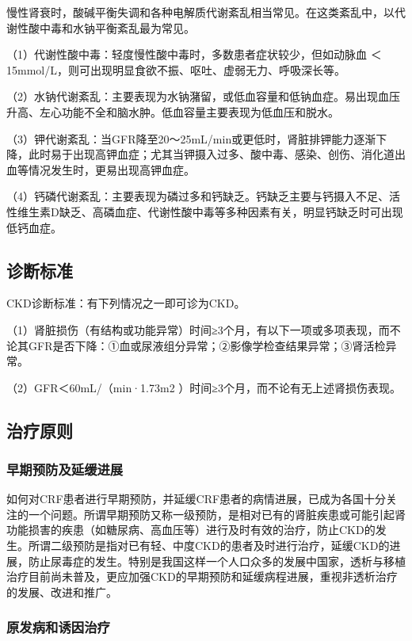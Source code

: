 慢性肾衰时，酸碱平衡失调和各种电解质代谢紊乱相当常见。在这类紊乱中，以代谢性酸中毒和水钠平衡紊乱最为常见。

（1）代谢性酸中毒：轻度慢性酸中毒时，多数患者症状较少，但如动脉血
＜15mmol/L，则可出现明显食欲不振、呕吐、虚弱无力、呼吸深长等。

（2）水钠代谢紊乱：主要表现为水钠潴留，或低血容量和低钠血症。易出现血压升高、左心功能不全和脑水肿。低血容量主要表现为低血压和脱水。

（3）钾代谢紊乱：当GFR降至20～25mL/min或更低时，肾脏排钾能力逐渐下降，此时易于出现高钾血症；尤其当钾摄入过多、酸中毒、感染、创伤、消化道出血等情况发生时，更易出现高钾血症。

（4）钙磷代谢紊乱：主要表现为磷过多和钙缺乏。钙缺乏主要与钙摄入不足、活性维生素D缺乏、高磷血症、代谢性酸中毒等多种因素有关，明显钙缺乏时可出现低钙血症。

\subsection{诊断标准}

CKD诊断标准：有下列情况之一即可诊为CKD。

（1）肾脏损伤（有结构或功能异常）时间≥3个月，有以下一项或多项表现，而不论其GFR是否下降：①血或尿液组分异常；②影像学检查结果异常；③肾活检异常。

（2）GFR＜60mL/（min·1.73m{2} ）时间≥3个月，而不论有无上述肾损伤表现。

\subsection{治疗原则}

\subsubsection{早期预防及延缓进展}

如何对CRF患者进行早期预防，并延缓CRF患者的病情进展，已成为各国十分关注的一个问题。所谓早期预防又称一级预防，是相对已有的肾脏疾患或可能引起肾功能损害的疾患（如糖尿病、高血压等）进行及时有效的治疗，防止CKD的发生。所谓二级预防是指对已有轻、中度CKD的患者及时进行治疗，延缓CKD的进展，防止尿毒症的发生。特别是我国这样一个人口众多的发展中国家，透析与移植治疗目前尚未普及，更应加强CKD的早期预防和延缓病程进展，重视非透析治疗的发展、改进和推广。

\subsubsection{原发病和诱因治疗}

